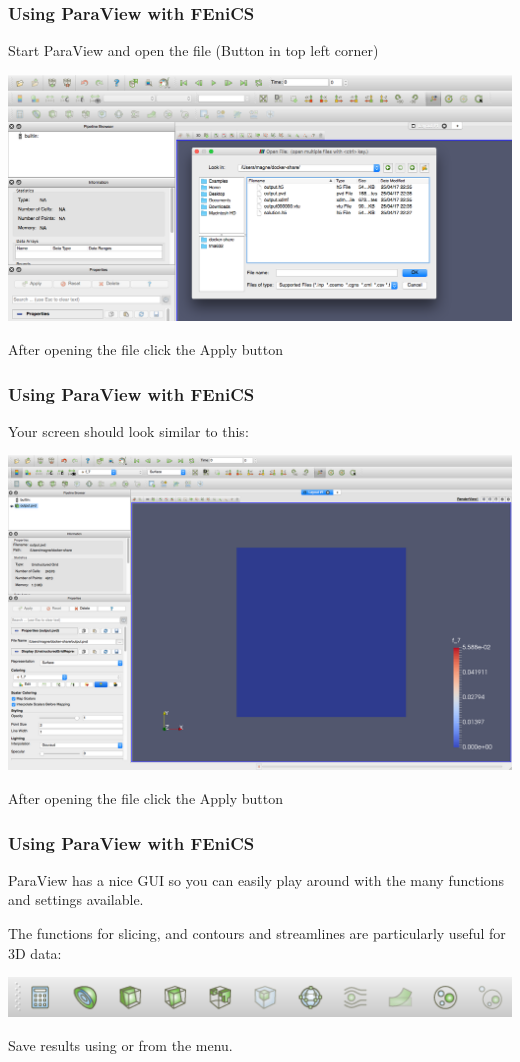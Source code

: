 \begin{frame}[fragile]
\frametitle{Using ParaView with FEniCS}
  Start ParaView and open the file
  (Button in top left corner)
  \begin{center}
    \includegraphics[width=\textwidth]{png/paraview_open.png}
  \end{center}
  After opening the file click the Apply button
\end{frame}

\begin{frame}[fragile]
\frametitle{Using ParaView with FEniCS}
  Your screen should look similar to this:
  \begin{center}
    \includegraphics[width=\textwidth]{png/paraview_screen.png}
  \end{center}
  After opening the file click the Apply button
\end{frame}


\begin{frame}[fragile]
\frametitle{Using ParaView with FEniCS}
  ParaView has a nice GUI so you can easily play around with the many functions and settings available.

  \bigskip

  The functions for slicing, and contours and streamlines are particularly useful for 3D data:
  \begin{center}
    \includegraphics[width=\textwidth]{png/paraview_buttons.png}
  \end{center}
  Save results using  or  from the menu.
\end{frame}

